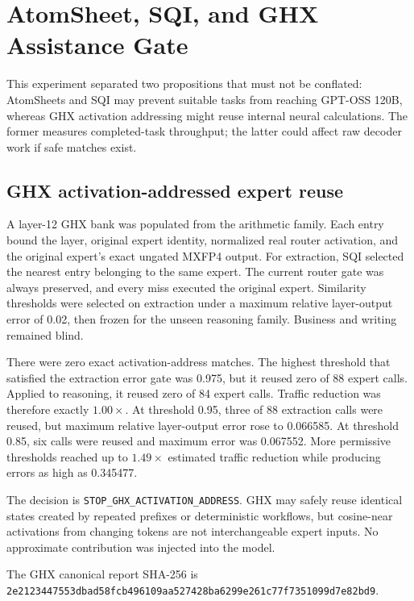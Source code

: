 \section{AtomSheet, SQI, and GHX Assistance Gate}
\label{sec:gptoss120b-atomsheet-sqi-ghx}

This experiment separated two propositions that must not be conflated:
AtomSheets and SQI may prevent suitable tasks from reaching GPT-OSS 120B,
whereas GHX activation addressing might reuse internal neural calculations.
The former measures completed-task throughput; the latter could affect raw
decoder work if safe matches exist.

\subsection{GHX activation-addressed expert reuse}

A layer-12 GHX bank was populated from the arithmetic family.  Each entry bound
the layer, original expert identity, normalized real router activation, and the
original expert's exact ungated MXFP4 output.  For extraction, SQI selected the
nearest entry belonging to the same expert.  The current router gate was always
preserved, and every miss executed the original expert.  Similarity thresholds
were selected on extraction under a maximum relative layer-output error of
0.02, then frozen for the unseen reasoning family.  Business and writing
remained blind.

There were zero exact activation-address matches.  The highest threshold that
satisfied the extraction error gate was 0.975, but it reused zero of 88 expert
calls.  Applied to reasoning, it reused zero of 84 expert calls.  Traffic
reduction was therefore exactly $1.00\times$.  At threshold 0.95, three of 88
extraction calls were reused, but maximum relative layer-output error rose to
0.066585.  At threshold 0.85, six calls were reused and maximum error was
0.067552.  More permissive thresholds reached up to $1.49\times$ estimated
traffic reduction while producing errors as high as 0.345477.

The decision is \texttt{STOP\_GHX\_ACTIVATION\_ADDRESS}.  GHX may safely reuse
identical states created by repeated prefixes or deterministic workflows, but
cosine-near activations from changing tokens are not interchangeable expert
inputs.  No approximate contribution was injected into the model.

The GHX canonical report SHA-256 is
\texttt{2e2123447553dbad58fcb496109aa527428ba6299e261c77f7351099d7e82bd9}.

